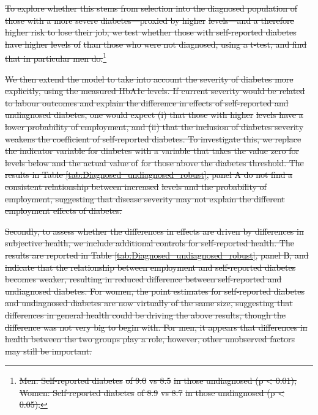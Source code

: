 \documentclass[12pt,english]{article}
\providecommand{\DIFdeltex}[1]{{\protect\color{red}\sout{#1}}}                      %
\providecommand{\DIFdelbegin}{} %
\providecommand{\DIFdel}[1]{\texorpdfstring{\DIFdeltex{#1}}{}} %
\begin{document}
\DIFdelbegin \DIFdel{To explore whether this stems from selection into the diagnosed population of those with a more severe diabetes---proxied by higher }%
\DIFdel{levels---and a therefore higher risk to lose their job,  we test whether those with self-reported diabetes have higher levels of }%
\DIFdel{than those who were not diagnosed, using a t-test, and find that in particular men do.}\footnote{\DIFdel{Men: Self-reported diabetes }%
\DIFdel{of 9.0}%
\DIFdel{vs 8.5}%
\DIFdel{in those undiagnosed (p < 0.01); Women: Self-reported diabetes }%
\DIFdel{of 8.9}%
\DIFdel{vs 8.7}%
\DIFdel{in those undiagnosed (p < 0.05).}} %
\addtocounter{footnote}{-1}%
\DIFdel{We then extend the model to take into account the severity of diabetes more explicitly, using the measured HbA1c levels. If current severity would be related to labour outcomes and explain the difference in effects of self-reported and undiagnosed diabetes, one would expect (i) that those with higher }%
\DIFdel{levels have a lower probability of employment, and (ii) that the inclusion of diabetes severity weakens the coefficient of self-reported diabetes.  To investigate this, we replace the indicator variable for diabetes with a variable that takes the value zero for levels below and the actual value of }%
\DIFdel{for those above the diabetes threshold. The results in Table \ref{tab:Diagnosed_undiagnosed_robust}, panel A do not find a consistent relationship between increased }%
\DIFdel{levels and the probability of employment, suggesting that disease severity may not explain the different employment effects of diabetes. 
}%

\DIFdel{Secondly, to assess whether the differences in effects are driven by differences in subjective health, we include additional controls for self-reported health. The results are reported in Table \ref{tab:Diagnosed_undiagnosed_robust}, panel B, and indicate that the relationship between employment and self-reported diabetes becomes weaker, resulting in reduced difference between self-reported and undiagnosed diabetes. For women, the point estimates for self-reported diabetes and undiagnosed diabetes are now virtually of the same size, suggesting that differences in general health could be driving the above results, though the difference was not very big to begin with. For men, it appears that differences in health between the two groups play a role, however, other unobserved factors may still be important.
}%
\end{document}
